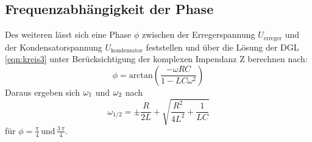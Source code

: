 \subsection{Frequenzabhängigkeit der Phase}
Des weiteren lässt sich eine Phase $\phi$ zwischen der Erregerspannung
$U_\text{erreger}$ und der Kondensatorspannung $U_\text{kondensator}$  feststellen und über
die Lösung der DGL \eqref{eqn:kreis3} unter Berücksichtigung der komplexen Impendanz Z berechnen nach:
\begin{equation}
  \phi = \text{arctan}\left(\frac{-\omega RC}{1-LC\omega^2}\right)
  \label{eqn:phase}
\end{equation}
Daraus ergeben sich $\omega_\text1$ und $\omega_\text2$ nach
\begin{equation}
  \omega_{1/2} = \pm \frac{R}{2L} + \sqrt{\frac{R^{2}}{4L^{2}} + \frac{1}{LC}}
  \label{o12}
\end{equation}
für $\phi = \frac{\pi}{4}\,\text{und}\, \frac{3\,\pi}{4}$.
